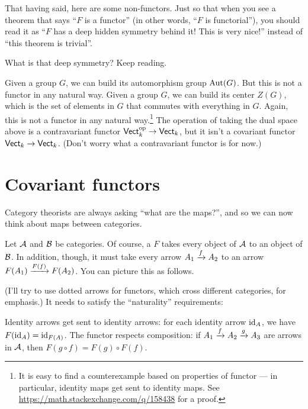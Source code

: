 That having said, here are some non-functors.
Just so that when you see a theorem that says ``$F$ is a functor''
(in other words, ``$F$ is functorial''), you should read it as
``$F$ has a deep hidden symmetry behind it! This is very nice!'' instead of ``this theorem is
trivial''.

What is that deep symmetry? Keep reading.
\begin{itemize}
	\ii Given a group $G$, we can build its automorphism group $\Aut(G)$. But this is not a functor
	in any natural way.
	\ii Given a group $G$, we can build its center $Z(G)$, which is the set of elements in $G$ that
	commutes with everything in $G$. Again, this is not a functor in any natural way.\footnote{%
	It is easy to find a counterexample based on properties of functor --- in particular, identity
	maps get sent to identity maps. See \url{https://math.stackexchange.com/q/158438} for a proof.}
	\ii The operation of taking the dual space above
	is a contravariant functor $\catname{Vect}_k\op \to \catname{Vect}_k$,
	but it isn't a covariant functor $\catname{Vect}_k \to \catname{Vect}_k$.
	(Don't worry what a contravariant functor is for now.)
\end{itemize}

\section{Covariant functors}
Category theorists are always asking ``what are the maps?'',
and so we can now think about maps between categories.

\begin{definition}
	Let $\AA$ and $\BB$ be categories.
	Of course, a  $F$ takes every object of $\AA$ to an object of $\BB$.
	In addition, though, it must take every arrow $A_1 \taking{f} A_2$
	to an arrow $F(A_1) \taking{F(f)} F(A_2)$.
	You can picture this as follows.
	\begin{center}
	\end{center}
	(I'll try to use dotted arrows for functors, which cross different categories, for emphasis.)
	It needs to satisfy the ``naturality'' requirements:
	\begin{itemize}
		\ii Identity arrows get sent to identity arrows:
		for each identity arrow $\id_A$, we have $F(\id_A) = \id_{F(A)}$.
		\ii The functor respects composition:
		if $A_1 \taking f A_2 \taking g A_3$ are arrows in $\AA$,
		then $F(g \circ f) = F(g) \circ F(f)$.
	\end{itemize}
\end{definition}

